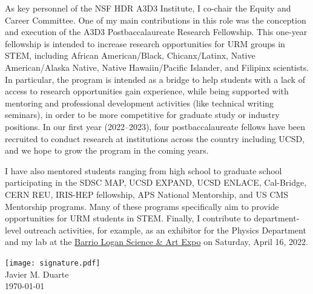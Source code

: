 \documentclass[11pt,letterpaper,notitlepage]{article}
\begin{document}
As key personnel of the NSF HDR A3D3 Institute, I co-chair the Equity and Career Committee.
One of my main contributions in this role was the conception and execution of the A3D3 Postbaccalaureate Research Fellowship.
This one-year fellowship is intended to increase research opportunities for URM groups in STEM, including African American/Black, Chicanx/Latinx, Native American/Alaska Native, Native Hawaiin/Pacific Islander, and Filipinx scientists.
In particular, the program is intended as a bridge to help students with a lack of access to research opportunities gain experience, while being supported with mentoring and professional development activities (like technical writing seminars), in order to be more competitive for graduate study or industry positions.
In our first year (2022--2023), four postbaccalaureate fellows have been recruited to conduct research at institutions across the country including UCSD, and we hope to grow the program in the coming years.

I have also mentored students ranging from high school to graduate school participating in the SDSC MAP, UCSD EXPAND, UCSD ENLACE, Cal-Bridge, CERN REU, IRIS-HEP fellowship, APS National Mentorship, and US CMS Mentorship programs.
Many of these programs specifically aim to provide opportunities for URM students in STEM.
Finally, I contribute to department-level outreach activities, for example, as an exhibitor for the Physics Department and my lab at the \href{https://www.barriologansae.com/}{Barrio Logan Science \& Art Expo} on Saturday, April 16, 2022.

\vspace{0.1in}
\texttt{[image: signature.pdf]}\\
\indent\indent Javier M. Duarte\\
\indent\indent \today
\end{document}
